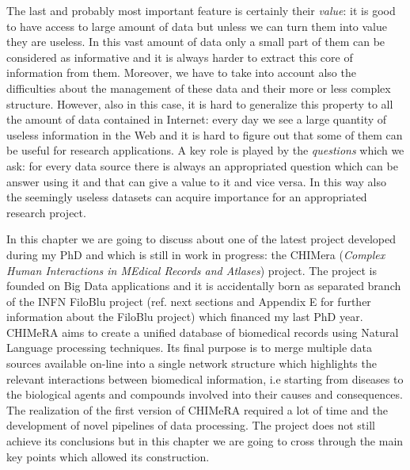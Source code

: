 \documentclass{standalone}
\begin{document}
The last and probably most important feature is certainly their \emph{value}: it is good to have access to large amount of data but unless we can turn them into value they are useless.
In this vast amount of data only a small part of them can be considered as informative and it is always harder to extract this core of information from them.
Moreover, we have to take into account also the difficulties about the management of these data and their more or less complex structure.
However, also in this case, it is hard to generalize this property to all the amount of data contained in Internet: every day we see a large quantity of useless information in the Web and it is hard to figure out that some of them can be useful for research applications.
A key role is played by the \emph{questions} which we ask: for every data source there is always an appropriated question which can be answer using it and that can give a value to it and vice versa.
In this way also the seemingly useless datasets can acquire importance for an appropriated research project.

In this chapter we are going to discuss about one of the latest project developed during my PhD and which is still in work in progress: the \textsf{CHIMera} (\emph{Complex Human Interactions in MEdical Records and Atlases}) project.
The project is founded on Big Data applications and it is accidentally born as separated branch of the INFN FiloBlu project (ref. next sections and Appendix E for further information about the FiloBlu project) which financed my last PhD year.
\textsf{CHIMeRA} aims to create a unified database of biomedical records using Natural Language processing techniques.
Its final purpose is to merge multiple data sources available on-line into a single network structure which highlights the relevant interactions between biomedical information, i.e starting from diseases to the biological agents and compounds involved into their causes and consequences.
The realization of the first version of \textsf{CHIMeRA} required a lot of time and the development of novel pipelines of data processing.
The project does not still achieve its conclusions but in this chapter we are going to cross through the main key points which allowed its construction.

\end{document}
